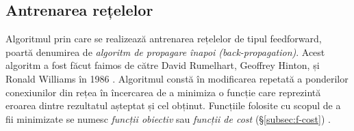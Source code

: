 \subsection{Antrenarea rețelelor}\label{subsec:antrenare}
Algoritmul prin care se realizează antrenarea rețelelor de tipul feedforward, poartă denumirea de \textit{algoritm de propagare înapoi (back-propagation)}. Acest algoritm a fost făcut faimos de către David Rumelhart, Geoffrey Hinton, și Ronald Williams în 1986 \cite{rumelhart1986}. Algoritmul constă în modificarea repetată a ponderilor conexiunilor din rețea în încercarea de a minimiza o funcție care reprezintă eroarea dintre rezultatul așteptat și cel obținut. Funcțiile folosite cu scopul de a fii minimizate se numesc \textit{funcții obiectiv} sau \textit{funcții de cost} (\S\ref{subsec:f-cost}) \cite{neuralnetbook:2015}.

